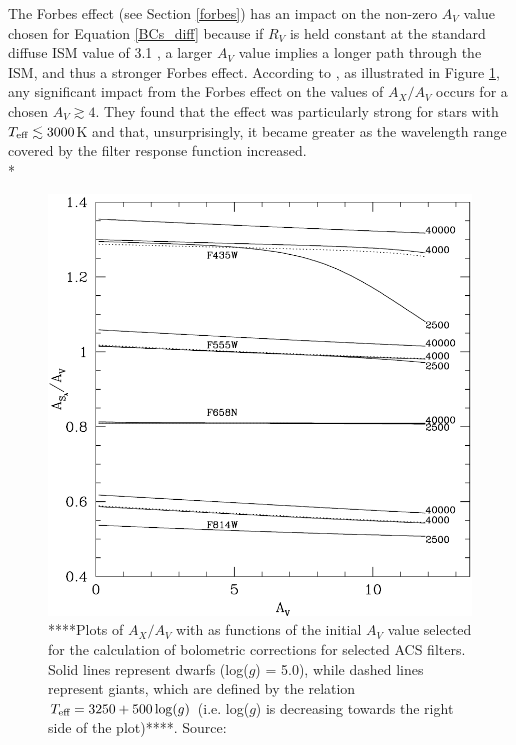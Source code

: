 \documentclass[12pt, a4paper]{report}
\begin{document}
The Forbes effect (see Section \ref{forbes}) has an impact on the non-zero $A_{V}$ value chosen for Equation \ref{BCs_diff} because if $R_{V}$ is held constant at the standard diffuse ISM value of 3.1 \citep{1989ApJ...345..245C}, a larger $A_{V}$ value implies a longer path through the ISM, and thus a stronger Forbes effect. According to \cite{2008PASP..120..583G}, as illustrated in Figure \ref{girardi_forbes}, any significant impact from the Forbes effect on the values of $A_{X}/A_{V}$ occurs for a chosen $A_{V} \gtrsim 4$. They found that the effect was particularly strong for stars with $T_{\textnormal{eff}} \lesssim 3000$K and that, unsurprisingly, it became greater as the wavelength range covered by the filter response function increased.\\*

\begin{figure}[h!]
\begin{center}
\includegraphics[width=1.0\textwidth]{girardi_forbes_effect_figure.png}
\caption{****Plots of $A_{X}/A_{V}$ with as functions of the initial $A_{V}$ value selected for the calculation of bolometric corrections for selected ACS filters. Solid lines represent dwarfs (log($g$) = 5.0), while dashed lines represent giants, which are defined by the relation $T_{\textnormal{eff}} = 3250 + 500\log(g)$ (i.e. log($g$) is decreasing towards the right side of the plot)****. Source: \cite{2008PASP..120..583G}}
\end{center}
\label{girardi_forbes}
\end{figure}
\end{document}
